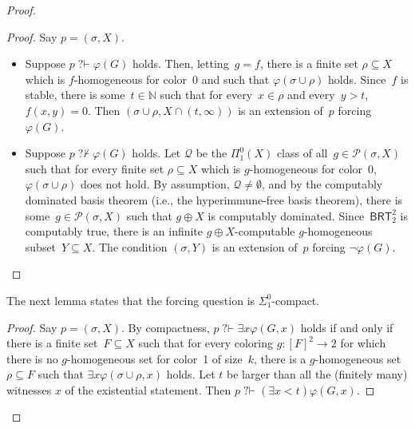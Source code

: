 \documentclass{article}
\def\Q{\mathcal{Q}}
\def\P{\mathcal{P}}
\def\Q{\mathcal{Q}}
\newcommand{\qvdash}{\operatorname{{?}{\vdash}}}
\newcommand{\nqvdash}{\operatorname{{?}{\nvdash}}}
\newcommand{\BRT}[0]{\mathsf{BRT}}
\newcommand{\NN}[0]{\mathbb{N}}
\numberwithin{theorem}{section}
\newtheorem{lemma}[theorem]{Lemma}
\begin{document}
\begin{proof}
\begin{proof}
Say $p = (\sigma, X)$.
\begin{itemize}
    \item[(i)] Suppose $p \qvdash \varphi(G)$ holds. Then, letting~$g = f$, there is a finite set $\rho \subseteq X$ which is $f$-homogeneous for color~0 and such that $\varphi(\sigma \cup \rho)$ holds. Since~$f$ is stable, there is some~$t \in \NN$ such that for every~$x \in \rho$ and every~$y > t$, $f(x, y) = 0$. Then $(\sigma \cup \rho, X \cap (t, \infty))$ is an extension of~$p$ forcing~$\varphi(G)$.

    \item[(ii)] Suppose $p \nqvdash \varphi(G)$ holds. Let $\Q$ be the $\Pi^0_1(X)$ class of all~$g \in \P(\sigma, X)$ such that for every finite set $\rho \subseteq X$ which is $g$-homogeneous for color~0, $\varphi(\sigma \cup \rho)$ does not hold. By assumption, $\Q \neq \emptyset$, and by the computably dominated basis theorem (i.e., the hyperimmune-free basis theorem), there is some~$g \in \P(\sigma, X)$ such that $g \oplus X$ is computably dominated. Since~$\BRT^2_2$ is computably true, there is an infinite $g \oplus X$-computable $g$-homogeneous subset~$Y \subseteq X$.
    The condition $(\sigma, Y)$ is an extension of~$p$ forcing $\neg \varphi(G)$. 
\end{itemize}
\end{proof}

The next lemma states that the forcing question is $\Sigma^0_1$-compact.

\begin{proof}
Say $p = (\sigma, X)$. By compactness, $p \qvdash \exists x \varphi(G, x)$ holds if and only if there is a finite set~$F \subseteq X$ such that for every coloring $g : [F]^2 \to 2$ for which there is no $g$-homogeneous set for color~1 of size~$k$, there is a $g$-homogeneous set~$\rho \subseteq F$ such that $\exists x \varphi(\sigma \cup \rho, x)$ holds. Let $t$ be larger than all the (finitely many) witnesses $x$ of the existential statement. Then $p \qvdash (\exists x < t)\varphi(G, x)$.
\end{proof}
\bigskip


\end{proof}
\end{document}
